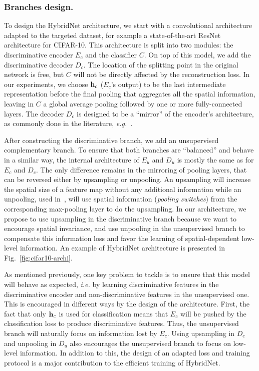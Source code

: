 \documentclass[runningheads]{llncs}
\begin{document}
\subsubsection{Branches design.}

To design the HybridNet architecture, we start with a convolutional architecture adapted to the targeted dataset, for example a state-of-the-art ResNet architecture for CIFAR-10. This architecture is split into two modules: the discriminative encoder $E_c$ and the classifier $C$. On top of this model, we add the discriminative decoder $D_c$.
The location of the splitting point in the original network is free, but $C$ will not be directly affected by the reconstruction loss. In our experiments, we choose $\mathbf{h}_c$ ($E_c$'s output) to be the last intermediate representation before the final pooling that aggregates all the spatial information, leaving in $C$ a global average pooling followed by one or more fully-connected layers. The decoder $D_c$ is designed to be a ``mirror'' of the encoder's architecture, as commonly done in the literature, \textit{e.g.}~\cite{Zhao2016a,Rasmus2015,zeiler2014visualizing}.

After constructing the discriminative branch, we add an unsupervised complementary branch. To ensure that both branches are ``balanced'' and behave in a similar way, the internal architecture of $E_u$ and $D_u$ is mostly the same as for $E_c$ and $D_c$. The only difference remains in the mirroring of pooling layers, that can be reversed either by upsampling or unpooling. An upsampling will increase the spatial size of a feature map without any additional information while an unpooling, used in~\cite{Zhao2016a,Zhang2016a}, will use spatial information (\textit{pooling switches}) from the corresponding max-pooling layer to do the upsampling. In our architecture, we propose to use upsampling in the discriminative branch because we want to encourage spatial invariance, and use unpooling in the unsupervised branch to compensate this information loss and favor the learning of spatial-dependent low-level information. An example of HybridNet architecture is presented in Fig.~\ref{fig:cifar10-archi}.

As mentioned previously, one key problem to tackle is to ensure that this model will behave as expected, \textit{i.e.} by learning discriminative features in the discriminative encoder and non-discriminative features in the unsupervised one.
This is encouraged in different ways by the design of the architecture. First, the fact that only $\mathbf{h}_c$ is used for classification means that $E_c$ will be pushed by the classification loss to produce discriminative features. Thus, the unsupervised branch will naturally focus on information lost by $E_c$. Using upsampling in $D_c$ and unpooling in $D_u$ also encourages the unsupervised branch to focus on low-level information. In addition to this, the design of an adapted loss and training protocol is a major contribution to the efficient training of HybridNet.
\end{document}
